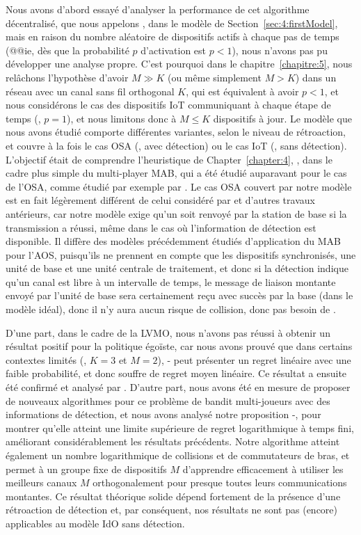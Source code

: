 \begin{resume_fr}
Nous avons d'abord essayé d'analyser la performance de cet algorithme décentralisé, que nous appelons \Selfish, dans le modèle de Section~\ref{sec:4:firstModel},
mais en raison du nombre aléatoire de dispositifs actifs à chaque pas de temps (@@ie, dès que la probabilité $p$ d'activation est $p < 1$), nous n'avons pas pu développer une analyse propre.
%
C'est pourquoi dans le chapitre~\ref{chapitre:5}, nous relâchons l'hypothèse d'avoir $M \gg K$ (ou même simplement $M > K$) dans un réseau avec un canal sans fil orthogonal $K$, qui est équivalent à avoir $p < 1$, et nous considérons le cas des dispositifs IoT communiquant à chaque étape de temps (\ie, $p=1$), et nous limitons donc à $M \leq K$ dispositifs à jour.
Le modèle que nous avons étudié comporte différentes variantes, selon le niveau de rétroaction, et couvre à la fois le cas OSA (\ie, avec détection) ou le cas IoT (\ie, sans détection).
L'objectif était de comprendre l'heuristique de Chapter~\ref{chapter:4}, \Selfish, dans le cadre plus simple du multi-player MAB, qui a été étudié auparavant pour le cas de l'OSA, comme étudié par exemple par \cite{Zhao10,Anandkumar10,Anandkumar11}.
%
Le cas OSA couvert par notre modèle est en fait légèrement différent de celui considéré par \cite{Jouini10} et d'autres travaux antérieurs,
car notre modèle exige qu'un \Ack{} soit renvoyé par la station de base si la transmission a réussi, même dans le cas où l'information de détection est disponible.
Il diffère des modèles précédemment étudiés d'application du MAB pour l'AOS, puisqu'ils ne prennent en compte que les dispositifs synchronisés, une unité de base et une unité centrale de traitement, et donc si la détection indique qu'un canal est libre à un intervalle de temps, le message de liaison montante envoyé par l'unité de base sera certainement reçu avec succès par la base (dans le modèle idéal), donc il n'y aura aucun risque de collision, donc pas besoin de \Ack.


D'une part, dans le cadre de la LVMO, nous n'avons pas réussi à obtenir un résultat positif pour la politique égoïste, car nous avons prouvé que dans certains contextes limités (\eg, $K=3$ et $M=2$), \Selfish-\UCB{} peut présenter un regret linéaire avec une faible probabilité, et donc souffre de regret moyen linéaire.
Ce résultat a ensuite été confirmé et analysé par \cite{BoursierPerchet18}.
%
D'autre part, nous avons été en mesure de proposer de nouveaux algorithmes pour ce problème de bandit multi-joueurs avec des informations de détection, et nous avons analysé notre proposition \MCTopM-\klUCB, pour montrer qu'elle atteint une limite supérieure de regret logarithmique à temps fini, améliorant considérablement les résultats précédents.
Notre algorithme atteint également un nombre logarithmique de collisions et de commutateurs de bras, et permet à un groupe fixe de dispositifs $M$ d'apprendre efficacement à utiliser les meilleurs canaux $M$ orthogonalement pour presque toutes leurs communications montantes.
%
Ce résultat théorique solide dépend fortement de la présence d'une rétroaction de détection et, par conséquent, nos résultats ne sont pas (encore) applicables au modèle IdO sans détection.



\end{resume_fr}

